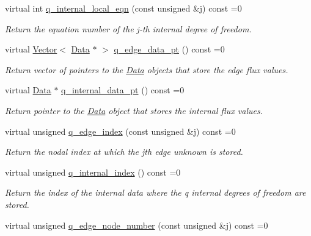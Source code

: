 \begin{DoxyCompactItemize}
virtual int \hyperlink{classoomph_1_1AxisymmetricPoroelasticityEquations_a310a9bba22acd741c86d3e67940b5935}{q\+\_\+internal\+\_\+local\+\_\+eqn} (const unsigned \&j) const =0
\begin{DoxyCompactList}\small\item\em Return the equation number of the j-\/th internal degree of freedom. \end{DoxyCompactList}\item 
virtual \hyperlink{classoomph_1_1Vector}{Vector}$<$ \hyperlink{classoomph_1_1Data}{Data} $\ast$ $>$ \hyperlink{classoomph_1_1AxisymmetricPoroelasticityEquations_a278e2b053f4c30b9da7a00ec063f1d7f}{q\+\_\+edge\+\_\+data\+\_\+pt} () const =0
\begin{DoxyCompactList}\small\item\em Return vector of pointers to the \hyperlink{classoomph_1_1Data}{Data} objects that store the edge flux values. \end{DoxyCompactList}\item 
virtual \hyperlink{classoomph_1_1Data}{Data} $\ast$ \hyperlink{classoomph_1_1AxisymmetricPoroelasticityEquations_ada5518ffc248b4c0ea00629c6376cb5c}{q\+\_\+internal\+\_\+data\+\_\+pt} () const =0
\begin{DoxyCompactList}\small\item\em Return pointer to the \hyperlink{classoomph_1_1Data}{Data} object that stores the internal flux values. \end{DoxyCompactList}\item 
virtual unsigned \hyperlink{classoomph_1_1AxisymmetricPoroelasticityEquations_a5dc540a1c4f63f5023d2688aa15c2614}{q\+\_\+edge\+\_\+index} (const unsigned \&j) const =0
\begin{DoxyCompactList}\small\item\em Return the nodal index at which the jth edge unknown is stored. \end{DoxyCompactList}\item 
virtual unsigned \hyperlink{classoomph_1_1AxisymmetricPoroelasticityEquations_a0c4a88ea26b89ce26aac6a04c21496dd}{q\+\_\+internal\+\_\+index} () const =0
\begin{DoxyCompactList}\small\item\em Return the index of the internal data where the q internal degrees of freedom are stored. \end{DoxyCompactList}\item 
virtual unsigned \hyperlink{classoomph_1_1AxisymmetricPoroelasticityEquations_a3067ec7af1ffb4656b63f5921a9a6467}{q\+\_\+edge\+\_\+node\+\_\+number} (const unsigned \&j) const =0

\end{DoxyCompactItemize}
